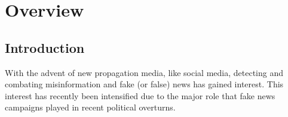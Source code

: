 \documentclass{report}
\theoremstyle{definition}
\begin{document}






\chapter{Overview}
\label{ch:overview}
\section{Introduction}
With the advent of new propagation media, like social media, detecting and combating misinformation and fake (or false) news has gained  interest. This interest has recently been intensified due to the major role that fake news campaigns played in recent political overturns.
\end{document}
